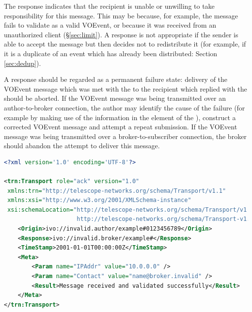 \documentclass[a4paper,11pt]{ivoa}
\begin{document}
The  response indicates that the recipient is unable or unwilling
to take responsibility for this message. This may be because, for example, the
message fails to validate as a valid VOEvent, or because it was received from
an unauthorized client (\S\ref{sec:limit}). A  response is not
appropriate if the sender is able to accept the message but then decides not
to redistribute it (for example, if it is a duplicate of an event which has
already been distributed: Section \ref{sec:dedup}).

A  response should be regarded as a permanent failure state:
delivery of the VOEvent message which was met with the  to the
recipient which replied with the  should be aborted. If the
VOEvent message was being transmitted over an author-to-broker connection,
the author may identify the cause of the failure (for example by making use of
the information in the  element of the ),
construct a corrected VOEvent message and attempt a repeat submission. If the
VOEvent message was being transmitted over a broker-to-subscriber connection,
the broker should abandon the attempt to deliver this message.

\begin{lstlisting}[language=XML,label=lst:ack,
                   caption=Sample VOEvent message receipt response indicating successful transmission (\xmlel{ack}).]
<?xml version='1.0' encoding='UTF-8'?>

<trn:Transport role="ack" version="1.0"
 xmlns:trn="http://telescope-networks.org/schema/Transport/v1.1"
 xmlns:xsi="http://www.w3.org/2001/XMLSchema-instance"
 xsi:schemaLocation="http://telescope-networks.org/schema/Transport/v1.1
                     http://telescope-networks.org/schema/Transport-v1.1.xsd">
    <Origin>ivo://invalid.author/example#0123456789</Origin>
    <Response>ivo://invalid.broker/example#</Response>
    <TimeStamp>2001-01-01T00:00:00Z</TimeStamp>
    <Meta>
        <Param name="IPAddr" value="10.0.0.0" />
        <Param name="Contact" value="name@broker.invalid" />
        <Result>Message received and validated successfully</Result>
    </Meta>
</trn:Transport>
\end{lstlisting}
\end{document}
